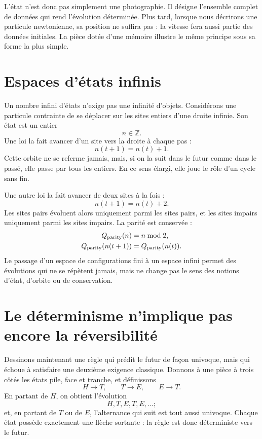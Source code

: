 L’état n’est donc pas simplement une photographie. Il désigne l’ensemble complet de données qui rend l’évolution déterminée. Plus tard, lorsque nous décrirons une particule newtonienne, sa position ne suffira pas : la vitesse fera aussi partie des données initiales. La pièce dotée d’une mémoire illustre le même principe sous sa forme la plus simple.

\section{Espaces d’états infinis}

Un nombre infini d’états n’exige pas une infinité d’objets. Considérons une particule contrainte de se déplacer sur les sites entiers d’une droite infinie. Son état est un entier
\[
  n\in\mathbb Z.
\]
Une loi la fait avancer d’un site vers la droite à chaque pas :
\begin{equation}
  n(t+1)=n(t)+1.
  \label{eq:lattice-one}
\end{equation}
Cette orbite ne se referme jamais, mais, si on la suit dans le futur comme dans le passé, elle passe par tous les entiers. En ce sens élargi, elle joue le rôle d’un cycle sans fin.

Une autre loi la fait avancer de deux sites à la fois :
\begin{equation}
  n(t+1)=n(t)+2.
  \label{eq:lattice-two}
\end{equation}
Les sites pairs évoluent alors uniquement parmi les sites pairs, et les sites impairs uniquement parmi les sites impairs. La parité est conservée :
\begin{equation}
  \begin{aligned}
    Q_{\rm parity}(n)&=n\bmod 2,\\
    Q_{\rm parity}(n(t+1))&=Q_{\rm parity}(n(t)).
  \end{aligned}
\end{equation}
Le passage d’un espace de configurations fini à un espace infini permet des évolutions qui ne se répètent jamais, mais ne change pas le sens des notions d’état, d’orbite ou de conservation.

\section{Le déterminisme n’implique pas encore la réversibilité}

Dessinons maintenant une règle qui prédit le futur de façon univoque, mais qui échoue à satisfaire une deuxième exigence classique. Donnons à une pièce à trois côtés les états pile, face et tranche, et définissons
\begin{equation}
  H\to T,
  \qquad
  T\to E,
  \qquad
  E\to T.
  \label{eq:nonreversible-map}
\end{equation}
En partant de \(H\), on obtient l’évolution
\[
  H,T,E,T,E,\ldots;
\]
et, en partant de \(T\) ou de \(E\), l’alternance qui suit est tout aussi univoque. Chaque état possède exactement une flèche sortante : la règle est donc déterministe vers le futur.


